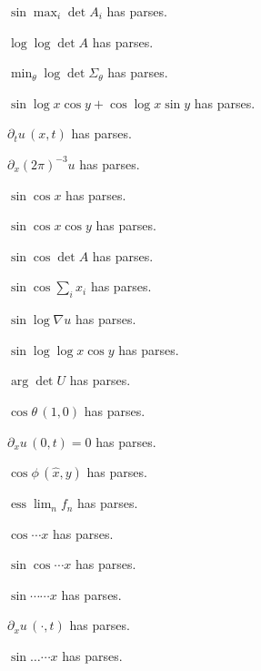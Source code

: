 \documentclass{article}
\makeatletter
\newcommand{\countparses}{\ltx@count@parses}
\makeatother
\begin{document}
$\sin\max_i\det A_i$ has \countparses{} parses.

$\log\log\det A$ has \countparses{} parses.

$\min_\theta\log\det\Sigma_\theta$ has \countparses{} parses.

$\sin\log x\cos y+\cos\log x\sin y$ has \countparses{} parses.

$\partial_t u\,(x,t)$ has \countparses{} parses.

$\partial_x(2\pi)^{-3}u$ has \countparses{} parses.

$\sin\cos x$ has \countparses{} parses.

$\sin\cos x\cos y$ has \countparses{} parses.

$\sin\cos\det A$ has \countparses{} parses.

$\sin\cos\sum_i x_i$ has \countparses{} parses.

$\sin\log\nabla u$ has \countparses{} parses.

$\sin\log\log x\cos y$ has \countparses{} parses.

$\arg\det U$ has \countparses{} parses.

$\cos\theta\,(1,0)$ has \countparses{} parses.

$\partial_x u\,(0,t)=0$ has \countparses{} parses.

$\cos\phi\,(\hat x,y)$ has \countparses{} parses.

$\operatorname{ess}\lim_n f_n$ has \countparses{} parses.

$\cos\cdots x$ has \countparses{} parses.

$\sin\cos\cdots x$ has \countparses{} parses.

$\sin\cdots\cdots x$ has \countparses{} parses.

$\partial_x u\,(\cdot,t)$ has \countparses{} parses.

$\sin\ldots\cdots x$ has \countparses{} parses.
\end{document}
